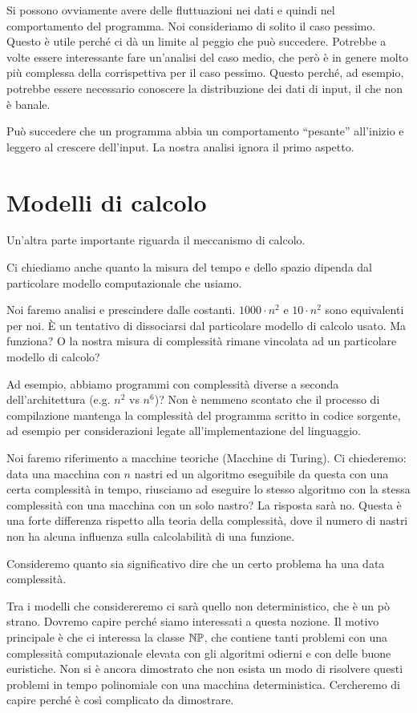 Si possono ovviamente avere delle fluttuazioni nei dati e quindi nel comportamento del programma.
Noi consideriamo di solito il caso pessimo. Questo è utile perché ci dà un limite al peggio che può
succedere. Potrebbe a volte essere interessante fare un'analisi del caso medio, che però è in genere
molto più complessa della corrispettiva per il caso pessimo. Questo perché, ad esempio, potrebbe
essere necessario conoscere la distribuzione dei dati di input, il che non è banale.

Può succedere che un programma abbia un comportamento ``pesante'' all'inizio e leggero al crescere
dell'input. La nostra analisi ignora il primo aspetto.

\section{Modelli di calcolo}

Un'altra parte importante riguarda il meccanismo di calcolo.

Ci chiediamo anche quanto la misura del tempo e dello spazio dipenda dal particolare modello
computazionale che usiamo.

Noi faremo analisi e prescindere dalle costanti. $1000\cdot n^{2}$ e $10\cdot n^{2}$ sono equivalenti per noi.
È un tentativo di dissociarsi dal particolare modello di calcolo usato. Ma funziona? O la nostra
misura di complessità rimane vincolata ad un particolare modello di calcolo?

Ad esempio, abbiamo programmi con complessità diverse a seconda dell'architettura (e.g. $n^{2}$ vs
$n^{6}$)? Non è nemmeno scontato che il processo di compilazione mantenga la complessità del
programma scritto in codice sorgente, ad esempio per considerazioni legate all'implementazione del
linguaggio.

Noi faremo riferimento a macchine teoriche (Macchine di Turing). Ci chiederemo: data una macchina
con $n$ nastri ed un algoritmo eseguibile da questa con una certa complessità in tempo, riusciamo
ad eseguire lo stesso algoritmo con la stessa complessità con una macchina con un solo nastro? La
risposta sarà no. Questa è una forte differenza rispetto alla teoria della complessità, dove il
numero di nastri non ha alcuna influenza sulla calcolabilità di una funzione.

Consideremo quanto sia significativo dire che un certo problema ha una data complessità.

Tra i modelli che considereremo ci sarà quello non deterministico, che è un pò strano. Dovremo
capire perché siamo interessati a questa nozione. Il motivo principale è che ci interessa la classe
$\mathbb{NP}$, che contiene tanti problemi con una complessità computazionale elevata con gli algoritmi
odierni e con delle buone euristiche. Non si è ancora dimostrato che non esista un modo di risolvere
questi problemi in tempo polinomiale con una macchina deterministica. Cercheremo di capire perché è
così complicato da dimostrare.

